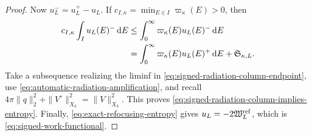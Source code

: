 \documentclass[11pt]{article}
\newcommand{\dd}{\,\mathrm d}
\theoremstyle{definition}
\theoremstyle{remark}
\begin{document}
\begin{proof}
Now $u^-_L=u^+_L-u_L$.  If
$c_{I,\kappa}=\min_{E\in I}\varpi_\kappa(E)>0$, then
\begin{align}
 c_{I,\kappa}\int_Iu_L(E)^-\dd E
 &\leq\int_0^\infty\varpi_\kappa(E)u_L(E)^-\dd E\notag\\
 &=\int_0^\infty\varpi_\kappa(E)u_L(E)^+\dd E
   +\mathfrak S_{\kappa,L}.
 \label{eq:signed-plus-amplification-decomposition}
\end{align}
Take a subsequence realizing the liminf in
\eqref{eq:signed-radiation-column-endpoint}, use
\eqref{eq:automatic-radiation-amplification}, and recall
$4\pi\|q\|_2^2+\|V^\circ\|_{X_3}^2=\|V\|_{X_3}^2$.  This proves
\eqref{eq:signed-radiation-column-implies-entropy}.  Finally,
\eqref{eq:exact-refocusing-entropy} gives
$u_L=-2\mathfrak W_L^{\rm ref}$, which is
\eqref{eq:signed-work-functional}.
\end{proof}
\end{document}
